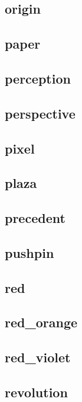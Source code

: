 \subsection{\ttfamily origin}
\newpage
\subsection{\ttfamily paper}
\newpage
\subsection{\ttfamily perception}
\newpage
\subsection{\ttfamily perspective}
\newpage
\subsection{\ttfamily pixel}
\newpage
\subsection{\ttfamily plaza}
\newpage
\subsection{\ttfamily precedent}
\newpage
\subsection{\ttfamily pushpin}
\newpage
\subsection{\ttfamily red}
\newpage
\subsection{\ttfamily red\_orange}
\newpage
\subsection{\ttfamily red\_violet}
\newpage
\subsection{\ttfamily revolution}
\newpage
